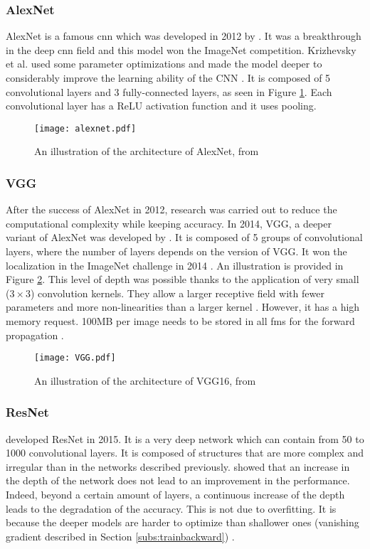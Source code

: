 \subsubsection{AlexNet}
%
AlexNet is a famous \acrshort{cnn} which was developed in 2012 by \textcite{krizhevsky_imagenet_2012}. It was a breakthrough in the deep \acrshort{cnn} field and this model won the ImageNet competition. Krizhevsky et al. used some parameter optimizations and made the model deeper to considerably improve the learning ability of the CNN \cite{khan_survey_2020}. It is composed of 5 convolutional layers and 3 fully-connected layers, as seen in Figure \ref{fig:alexnet}. Each convolutional layer has a ReLU activation function and it uses pooling.
%
\begin{figure}[H]
    \centering
    \texttt{[image: alexnet.pdf]}
    \caption{An illustration of the architecture of AlexNet, from \cite{krizhevsky_imagenet_2012}}
    \label{fig:alexnet}
\end{figure}
%
\subsubsection{VGG}
%
After the success of AlexNet in 2012, research was carried out to reduce the computational complexity while keeping accuracy. In 2014, VGG, a deeper variant of AlexNet was developed by \textcite{simonyan_very_2015}. It is composed of 5 groups of convolutional layers, where the number of layers depends on the version of VGG. It won the localization in the ImageNet challenge in 2014 \cite{simonyan_very_2015}. An illustration is provided in Figure \ref{fig:vgg}. This level of depth was possible thanks to the application of very small ($3 \times 3$) convolution kernels. They allow a larger receptive field with fewer parameters and more non-linearities than a larger kernel \cite{matteucci_artificial_2019}. However, it has a high memory request. 100MB per image needs to be stored in all \acrshort{fm}s for the forward propagation \cite{matteucci_artificial_2019}.
%
\begin{figure}[H]
    \centering
    \texttt{[image: VGG.pdf]}
    \caption{An illustration of the architecture of VGG16, from \cite{simonyan_very_2015}}
    \label{fig:vgg}
\end{figure}
%
\subsubsection{ResNet}
%
\textcite{he_deep_2016} developed ResNet in 2015. It is a very deep network which can contain from 50 to 1000 convolutional layers. It is composed of structures that are more complex and irregular than in the networks described previously. \textcite{he_deep_2016} showed that an increase in the depth of the network does not lead to an improvement in the performance. Indeed, beyond a certain amount of layers, a continuous increase of the depth leads to the degradation of the accuracy. This is not due to overfitting. It is because the deeper models are harder to optimize than shallower ones (vanishing gradient described in Section \ref{subs:trainbackward}) \cite{matteucci_artificial_2019}. 

